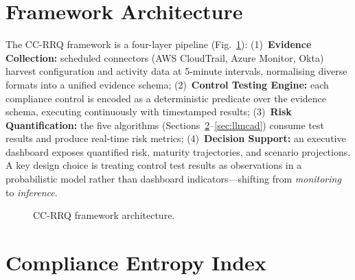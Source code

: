 \documentclass[conference]{IEEEtran}
\begin{document}
\section{Framework Architecture}
\label{sec:framework}

The CC-RRQ framework is a four-layer pipeline (Fig.~\ref{fig:architecture}): (1)~\textbf{Evidence Collection:} scheduled connectors (AWS CloudTrail, Azure Monitor, Okta) harvest configuration and activity data at 5-minute intervals, normalising diverse formats into a unified evidence schema; (2)~\textbf{Control Testing Engine:} each compliance control is encoded as a deterministic predicate over the evidence schema, executing continuously with timestamped results; (3)~\textbf{Risk Quantification:} the five algorithms (Sections~\ref{sec:cei}--\ref{sec:llmcad}) consume test results and produce real-time risk metrics; (4)~\textbf{Decision Support:} an executive dashboard exposes quantified risk, maturity trajectories, and scenario projections. A key design choice is treating control test results as observations in a probabilistic model rather than dashboard indicators---shifting from \emph{monitoring} to \emph{inference}.

\begin{figure}[h]
  \centering
  \caption{CC-RRQ framework architecture.}
  \label{fig:architecture}
\end{figure}

\section{Compliance Entropy Index}
\label{sec:cei}
\end{document}
